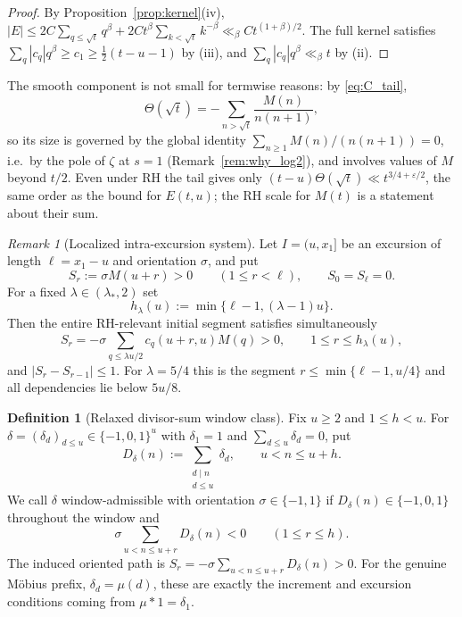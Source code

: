 \documentclass[11pt]{amsart}
\numberwithin{equation}{section}
\theoremstyle{plain}
\theoremstyle{definition}
\newtheorem{definition}[theorem]{Definition}
\theoremstyle{remark}
\newtheorem{remark}[theorem]{Remark}
\newcommand{\eps}{\varepsilon}
\begin{document}
\begin{proof}
By Proposition~\ref{prop:kernel}(iv),
$|E|\le2C\sum_{q\le\sqrt t}q^\beta+2Ct^\beta\sum_{k<\sqrt t}k^{-\beta}
\ll_\beta Ct^{(1+\beta)/2}$. The full kernel satisfies
$\sum_q|c_q|q^\beta\ge c_1\ge\frac12(t-u-1)$ by (iii), and
$\sum_q|c_q|q^\beta\ll_\beta t$ by (ii).
\end{proof}

The smooth component is not small for termwise reasons: by
\eqref{eq:C_tail},
\[
\Theta(\sqrt t)=-\sum_{n>\sqrt t}\frac{M(n)}{n(n+1)},
\]
so its size is governed by the global identity
$\sum_{n\ge1}M(n)/(n(n+1))=0$, i.e.\ by the pole of $\zeta$ at $s=1$
(Remark~\ref{rem:why_log2}), and involves values of $M$ beyond $t/2$. Even
under RH the tail gives only $(t-u)\Theta(\sqrt t)\ll t^{3/4+\eps/2}$, the
same order as the bound for $E(t,u)$; the RH scale for $M(t)$ is a statement
about their sum.

\begin{remark}[Localized intra-excursion system]
\label{rem:sign-cone}
Let $I=(u,x_1]$ be an excursion of length $\ell=x_1-u$ and orientation
$\sigma$, and put
\[
S_r:=\sigma M(u+r)>0\qquad(1\le r<\ell),\qquad S_0=S_\ell=0.
\]
For a fixed $\lambda\in(\lambda_*,2)$ set
\[
h_\lambda(u):=\min\{\ell-1,(\lambda-1)u\}.
\]
Then the entire RH-relevant initial segment satisfies simultaneously
\[
S_r=-\sigma\sum_{q\le\lambda u/2}c_q(u+r,u)M(q)>0,
\qquad1\le r\le h_\lambda(u),
\]
and $|S_r-S_{r-1}|\le1$.  For $\lambda=5/4$ this is the segment
$r\le\min\{\ell-1,u/4\}$ and all dependencies lie below $5u/8$.
\end{remark}

\begin{definition}[Relaxed divisor-sum window class]
\label{def:relaxed-divisor-cone}
Fix $u\ge2$ and $1\le h<u$.  For
$\delta=(\delta_d)_{d\le u}\in\{-1,0,1\}^u$ with $\delta_1=1$ and
$\sum_{d\le u}\delta_d=0$, put
\[
D_\delta(n):=\sum_{\substack{d\mid n\\ d\le u}}\delta_d,
\qquad u<n\le u+h.
\]
We call $\delta$ window-admissible with orientation $\sigma\in\{-1,1\}$ if
$D_\delta(n)\in\{-1,0,1\}$ throughout the window and
\[
\sigma\sum_{u<n\le u+r}D_\delta(n)<0
\qquad(1\le r\le h).
\]
The induced oriented path is
$S_r=-\sigma\sum_{u<n\le u+r}D_\delta(n)>0$.
For the genuine M\"obius prefix, $\delta_d=\mu(d)$, these are exactly the
increment and excursion conditions coming from $\mu*1=\delta_1$.
\end{definition}
\end{document}

